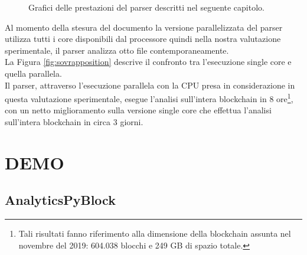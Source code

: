 \begin{figure}
	\centering
	\caption{Grafici delle prestazioni del parser descritti nel seguente capitolo.}
	\label{fig:analisisScript}
\end{figure}

Al momento della stesura del documento la versione parallelizzata del parser utilizza tutti i core disponibili dal processore quindi nella nostra valutazione sperimentale, il parser analizza otto file contemporaneamente.\\
La Figura \ref{fig:sovrapposition} descrive il confronto tra l'esecuzione single core e quella parallela.\\
Il parser, attraverso l'esecuzione parallela con la CPU presa in considerazione in questa valutazione sperimentale, esegue l'analisi sull'intera blockchain in 8 ore\footnote{Tali risultati fanno riferimento alla dimensione della blockchain assunta nel novembre del 2019: 604.038 blocchi e 249 GB di spazio totale.}, con un netto miglioramento sulla versione single core che effettua l'analisi sull'intera blockchain in circa 3 giorni.

\section{DEMO} \label{sec:solDemo}

\subsection{AnalyticsPyBlock} \label{sec:AnalyticsPyBlock}

